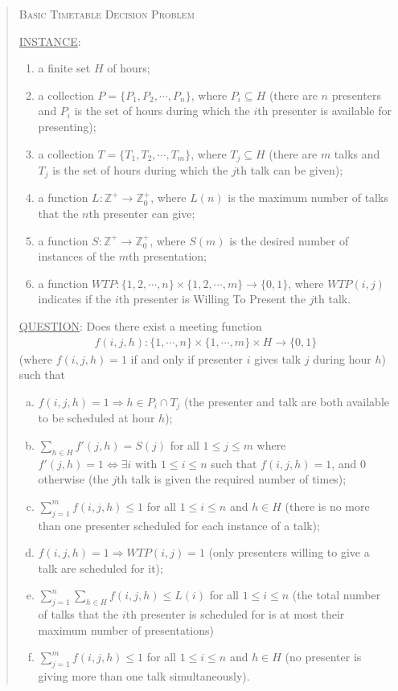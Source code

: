 \documentclass[]{article}
\theoremstyle{definition}
\theoremstyle{remark}
\numberwithin{equation}{section}
\begin{document}
\begin{quote}
	\textsc{Basic Timetable Decision Problem}
	
	\underline{INSTANCE}:
		\begin{enumerate}
			\item a finite set $H$ of hours;
			\item a collection $P = \{P_1, P_2, \cdots, P_n\}$, where $P_i \subseteq H$ (there are $n$ presenters and $P_i$ is the set of hours during which the $i$th presenter is available for presenting);
			\item a collection $T = \{T_1, T_2, \cdots, T_m\}$, where $T_j \subseteq H$ (there are $m$ talks and $T_j$ is the set of hours during which the $j$th talk can be given);
			\item a function $L : \mathbb Z^+ \rightarrow \mathbb Z_0^+$, where $L(n)$ is the maximum number of talks that the $n$th presenter can give;
			\item a function $S : \mathbb Z^+ \rightarrow \mathbb Z_0^+$, where $S(m)$ is the desired number of instances of the $m$th presentation;
			\item a function $WTP : \{1,2,\cdots, n\} \times \{1,2,\cdots,m\} \rightarrow \{0,1\}$, where $WTP(i,j)$ indicates if the $i$th presenter is Willing To Present the $j$th talk.
		\end{enumerate}
		\underline{QUESTION}: Does there exist a meeting function 
		\begin{gather*}
			f(i,j,h) : \{1,\cdots,n\} \times \{1,\cdots,m\} \times H \rightarrow \{0,1\}
		\end{gather*}
		(where $f(i,j,h)=1$ if and only if presenter $i$ gives talk $j$ during hour $h$) such that
		\begin{enumerate}[(a)]
			\item $f(i,j,h) = 1 \Rightarrow h \in P_i \cap T_j$ (the presenter and talk are both available to be scheduled at hour $h$);
			\item $\sum\limits_{h \in H} f'(j,h) = S(j)$ for all $1 \le j \le m$ where $f'(j,h) = 1 \iff \exists i \text{ with } 1 \le i \le n$ such that $f(i,j,h)=1$, and 0 otherwise (the $j$th talk is given the required number of times);
			\item $\sum\limits_{j=1}^{m} f(i,j,h) \le 1$ for all $1 \le i \le n$ and $h \in H$ (there is no more than one presenter scheduled for each instance of a talk);
			\item $f(i,j,h) = 1 \Rightarrow WTP(i,j) = 1$ (only presenters willing to give a talk are scheduled for it);
			\item $\sum\limits_{j=1}^n\sum\limits_{h \in H} f(i,j,h) \le L(i)$ for all $1 \le i \le n$ (the total number of talks that the $i$th presenter is scheduled for is at most their maximum number of presentations)
			\item $\sum\limits_{j=1}^m f(i,j,h) \le 1$ for all $1 \le i \le n$ and $h \in H$ (no presenter is giving more than one talk simultaneously).
		\end{enumerate}
\end{quote}
\end{document}
